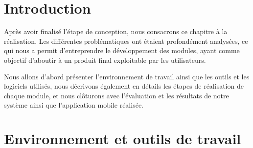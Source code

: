 
\newpage
\section{Introduction}
Après avoir finalisé l'étape de conception, nous consacrons ce chapitre à la réalisation. Les différentes problématiques ont étaient profondément analysées, ce qui nous a permit d'entreprendre le développement des modules, ayant comme objectif d'aboutir à un produit final exploitable par les utilisateurs.

Nous allons d'abord présenter l'environnement de travail ainsi que les outils et les logiciels utilisés, nous décrivons également en détails les étapes de réalisation de chaque module, et nous clôturons avec l'évaluation et les résultats de notre système ainsi que l'application mobile réalisée.
\section{Environnement et outils de travail}

